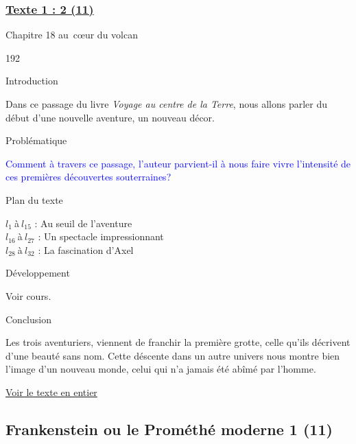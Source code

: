 \documentclass[12pt,a4paper]{article}
\begin{document}
				\subsubsection[Texte 2 (10)]{\textbf{\underline{Texte 1 : 2 (11)}}}
		Chapitre 18 au~c\oe ur du volcan
\begin{dingautolist}{192}

\item Introduction \par
Dans ce passage du livre \textit{Voyage au centre de la Terre}, nous allons parler du début d'une nouvelle aventure, un nouveau décor. 


\item Probl\'ematique \par
	\textcolor{blue}{Comment à travers ce passage, l’auteur parvient-il à nous faire vivre l’intensité de ces premières découvertes souterraines?}
\item Plan du texte \par
	$l_{1}~$\`a$~l_{15}$ : Au seuil de l'aventure\\
    $l_{16}~$\`a$~l_{27}$ : Un spectacle impressionnant\\
    $l_{28}~$\`a$~l_{32}$ : La fascination d'Axel

\item D\'eveloppement \par
        Voir cours.

\item Conclusion \par
Les trois aventuriers, viennent de franchir la première grotte, celle qu'ils décrivent d'une beauté sans nom. Cette déscente dans un autre univers nous montre bien l'image d'un nouveau monde, celui qui n'a jamais été abîmé par l'homme. 

\end{dingautolist}
\href{.extra/Textes/J.Verne_texte_2.pdf}{Voir le texte en entier}

\newpage
\subsection{Frankenstein ou le Prom\'eth\'e moderne 1 (11) }
\end{document}
